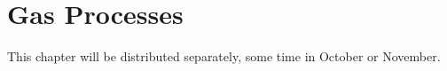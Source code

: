 \chapter{Gas Processes}
\label{chapter:gas_processes}

This chapter will be distributed separately, some time in October or
November.










